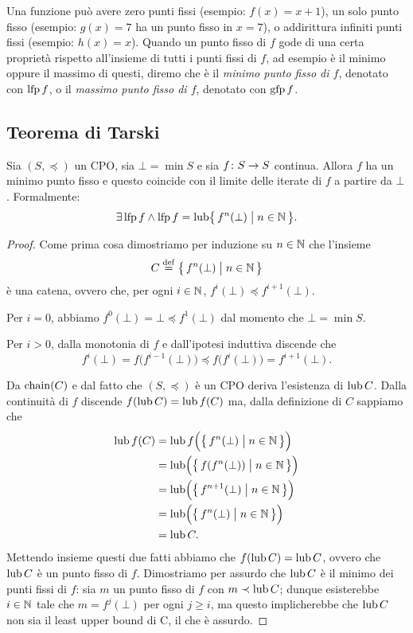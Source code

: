 Una funzione può avere zero punti fissi (esempio: $f(x) = x+1$),
un solo punto fisso
(esempio: $g(x) = 7$ ha un punto fisso in $x=7$),
o addirittura infiniti punti fissi (esempio: $h(x) = x$).
Quando un punto fisso di $f$ gode di una certa proprietà rispetto
all'insieme di tutti i punti fissi di $f$, ad esempio è il minimo
oppure il massimo di questi, diremo che è il
\emph{minimo punto fisso di $f$}, denotato con $\mathop{\mathrm{lfp}}\nolimits f$,
o il \emph{massimo punto fisso di $f$}, denotato con $\mathop{\mathrm{gfp}}\nolimits f$.

\subsection{Teorema di Tarski}
\label{sec:Tarski}

\begin{teorema} 
\label{teo:Tarski}
Sia $(S, \preceq)$ un CPO, sia $\bot = \min S$ e sia
$\mathord{f}\colon S\to S$ continua.
Allora $f$ ha un minimo punto fisso e questo coincide con il limite
delle iterate di $f$ a partire da $\bot$.
Formalmente:
\[
  \exists \mathop{\mathrm{lfp}}\nolimits f
    \land
      \mathop{\mathrm{lfp}}\nolimits f = \mathop{\mathrm{lub}}\nolimits \bigl\{\, f^n(\bot) \bigm| n \in \mathbb{N} \,\bigr\}.
\]
\begin{proof}
Come prima cosa dimostriamo per induzione su $n \in \mathbb{N}$
che l'insieme
\[
  C \defeq \bigl\{\, f^n(\bot) \bigm| n \in \Nset \,\bigr\}
\]
è una catena, ovvero che, per ogni $i \in \mathbb{N}$,
$f^i(\bot) \preceq f^{i+1}(\bot)$.

Per $i = 0$, abbiamo $f^0(\bot) = \bot \preceq f^1(\bot)$
dal momento che $\bot = \min S$.

Per $i > 0$, dalla monotonia di $f$ e dall'ipotesi induttiva discende che
\[
  f^i(\bot) = f\bigl(f^{i-1}(\bot)\bigr)
            \preceq f\bigl(f^i(\bot)\bigr)
            = f^{i+1}(\bot).
\]

Da $\mathop{\mathrm{chain}}\nolimits(C)$ e dal fatto che $(S, \preceq)$ è un CPO deriva l'esistenza
di $\mathop{\mathrm{lub}}\nolimits C$.
Dalla continuità di $f$ discende $f(\mathop{\mathrm{lub}}\nolimits C) = \mathop{\mathrm{lub}}\nolimits f(C)$ ma,
dalla definizione di $C$ sappiamo che
\begin{align*}
  \mathop{\mathrm{lub}}\nolimits f(C)
    &= \mathop{\mathrm{lub}}\nolimits f\Bigl(\bigl\{\, f^n(\bot) \bigm| n \in \mathbb{N} \,\bigr\}\Bigr) \\
    &= \mathop{\mathrm{lub}}\nolimits \Bigl(\bigl\{\, f(f^n(\bot)) \bigm| n \in \mathbb{N} \,\bigr\}\Bigr) \\
    &= \mathop{\mathrm{lub}}\nolimits \Bigl(\bigl\{\, f^{n+1}(\bot) \bigm| n \in \mathbb{N} \,\bigr\}\Bigr) \\
    &= \mathop{\mathrm{lub}}\nolimits \Bigl(\bigl\{\, f^n(\bot) \bigm| n \in \mathbb{N} \,\bigr\}\Bigr) \\
    &= \mathop{\mathrm{lub}}\nolimits C.
\end{align*}
Mettendo insieme questi due fatti abbiamo che $f(\mathop{\mathrm{lub}}\nolimits C) = \mathop{\mathrm{lub}}\nolimits C$,
ovvero che $\mathop{\mathrm{lub}}\nolimits C$ è un punto fisso di $f$.
Dimostriamo per assurdo che $\mathop{\mathrm{lub}}\nolimits C$ è il minimo dei punti fissi di $f$:
sia $m$ un punto fisso di $f$ con $m \prec \mathop{\mathrm{lub}}\nolimits C$;
dunque esisterebbe $i \in \mathbb{N}$ tale che $m = f^j(\bot)$ per ogni $j \geq i$,
ma questo implicherebbe che $\mathop{\mathrm{lub}}\nolimits C$ non sia il least upper bound di C,
il che è assurdo.
  \end{proof}
\end{teorema}
